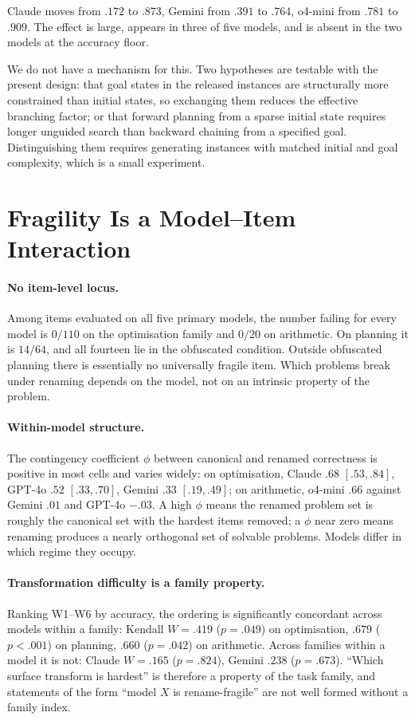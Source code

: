 \documentclass{article}
\begin{document}
Claude moves from $.172$ to $.873$, Gemini from $.391$ to $.764$, o4-mini from
$.781$ to $.909$. The effect is large, appears in three of five models, and is
absent in the two models at the accuracy floor.

We do not have a mechanism for this. Two hypotheses are testable with the present
design: that goal states in the released instances are structurally more constrained
than initial states, so exchanging them reduces the effective branching factor; or
that forward planning from a sparse initial state requires longer unguided search
than backward chaining from a specified goal. Distinguishing them requires
generating instances with matched initial and goal complexity, which is a small
experiment.

\section{Fragility Is a Model--Item Interaction}

\paragraph{No item-level locus.} Among items evaluated on all five primary models,
the number failing for every model is $0/110$ on the optimisation family and $0/20$
on arithmetic. On planning it is $14/64$, and all fourteen lie in the obfuscated
condition. Outside obfuscated planning there is essentially no universally fragile
item. Which problems break under renaming depends on the model, not on an intrinsic
property of the problem.

\paragraph{Within-model structure.} The contingency coefficient $\phi$ between
canonical and renamed correctness is positive in most cells and varies widely:
on optimisation, Claude $.68$ $[.53, .84]$, GPT-4o $.52$ $[.33, .70]$, Gemini $.33$
$[.19, .49]$; on arithmetic, o4-mini $.66$ against Gemini $.01$ and GPT-4o $-.03$.
A high $\phi$ means the renamed problem set is roughly the canonical set with the
hardest items removed; a $\phi$ near zero means renaming produces a nearly
orthogonal set of solvable problems. Models differ in which regime they occupy.

\paragraph{Transformation difficulty is a family property.} Ranking W1--W6 by
accuracy, the ordering is significantly concordant across models within a family:
Kendall $W = .419$ ($p = .049$) on optimisation, $.679$ ($p < .001$) on planning,
$.660$ ($p = .042$) on arithmetic. Across families within a model it is not:
Claude $W = .165$ ($p = .824$), Gemini $.238$ ($p = .673$). ``Which surface
transform is hardest'' is therefore a property of the task family, and statements of
the form ``model $X$ is rename-fragile'' are not well formed without a family index.
\end{document}
